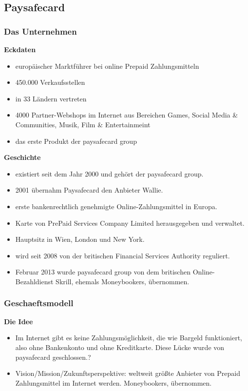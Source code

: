 \subsection{Paysafecard}
\subsubsection{Das Unternehmen}


\textbf{Eckdaten}

\begin{itemize}
        \item europäischer Marktführer bei online Prepaid Zahlungsmitteln
        \item 450.000 Verkaufsstellen
        \item in 33 Ländern vertreten
        \item 4000 Partner-Webshops im Internet aus Bereichen Games, Social Media \& Communities, Musik, Film \& Entertainmeint
        \item das erste Produkt der paysafecard group
\end{itemize}


\textbf{Geschichte}

\begin{itemize}
        \item existiert seit dem Jahr 2000 und gehört der paysafecard group.
        \item 2001 übernahm Paysafecard den Anbieter Wallie.
        \item erste bankenrechtlich genehmigte Online-Zahlungsmittel in Europa.
        \item Karte von PrePaid Services Company Limited herausgegeben und verwaltet.
        \item Hauptsitz in Wien, London und New York.
        \item wird seit 2008 von der britischen Financial Services Authority reguliert.
        \item Februar 2013 wurde paysafecard group von dem britischen Online-Bezahldienst Skrill, ehemals Moneybookers, übernommen.
\end{itemize}

\subsubsection{Geschaeftsmodell}
\textbf{Die Idee}

\begin{itemize}
        \item Im Internet gibt es keine Zahlungsmöglichkeit, die wie Bargeld funktioniert, also ohne Bankenkonto und ohne Kreditkarte. Diese Lücke wurde von paysafecard geschlossen.?
        \item Vision/Mission/Zukunftsperspektive:
weltweit größte Anbieter von Prepaid Zahlungsmittel im Internet werden. Moneybookers, übernommen.
\end{itemize}

